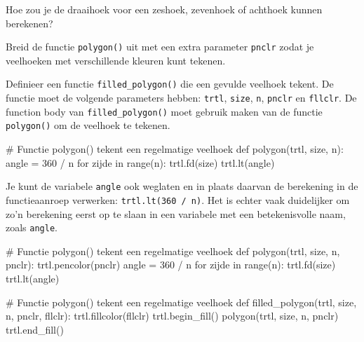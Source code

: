 \documentclass[../main]{subfiles}
\begin{document}
\begin{opgave}[icons={laptop}]
\begin{qlist}
\begin{hints}[leftmargin=0.8cm, labelwidth=0.8cm]
Hoe zou je de draaihoek voor een zeshoek, zevenhoek of achthoek kunnen berekenen?
\end{hints}
\item Breid de functie \texttt{polygon()} uit met een extra parameter \texttt{pnclr} zodat je veelhoeken met verschillende kleuren kunt tekenen.
\item Definieer een functie \texttt{filled\_polygon()} die een gevulde veelhoek tekent. De functie moet de volgende parameters hebben: \texttt{trtl}, \texttt{size}, \texttt{n}, \texttt{pnclr} en \texttt{fllclr}. De function body van \texttt{filled\_polygon()} moet gebruik maken van de functie \texttt{polygon()} om de veelhoek te tekenen.
\begin{center}
\end{center}
\end{qlist}
\end{opgave}
\begin{antwoord}
\begin{qlist}[leftmargin=1cm, labelwidth=1cm]
\item
\begin{python-breakable}[style=mu-noframe, numbers=none, aboveskip=0pt]
# Functie polygon() tekent een regelmatige veelhoek
def polygon(trtl, size, n):
    angle = 360 / n
    for zijde in range(n):
        trtl.fd(size)
        trtl.lt(angle)
\end{python-breakable}
Je kunt de variabele \texttt{angle} ook weglaten en in plaats daarvan de berekening in de functieaanroep verwerken: \texttt{trtl.lt(360 / n)}. Het is echter vaak duidelijker om zo'n berekening eerst op te slaan in een variabele met een betekenisvolle naam, zoals \texttt{angle}.
\item
\begin{python}[style=mu-noframe, numbers=none, aboveskip=0pt]
# Functie polygon() tekent een regelmatige veelhoek
def polygon(trtl, size, n, pnclr):
    trtl.pencolor(pnclr)
    angle = 360 / n
    for zijde in range(n):
        trtl.fd(size)
        trtl.lt(angle)
\end{python}
\item 
\begin{python}[style=mu-noframe, numbers=none, aboveskip=0pt]
# Functie polygon() tekent een regelmatige veelhoek
def filled_polygon(trtl, size, n, pnclr, fllclr):
    trtl.fillcolor(fllclr)
    trtl.begin_fill()
    polygon(trtl, size, n, pnclr)
    trtl.end_fill()
\end{python}
\end{qlist}
\end{antwoord}
\end{document}
